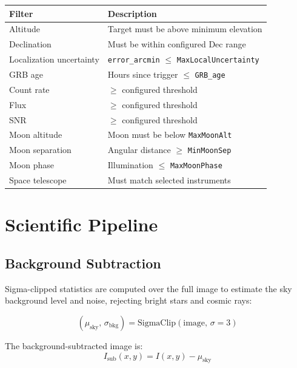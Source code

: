\documentclass[12pt,a4paper]{article}
\begin{document}
\begin{center}
\begin{tabular}{ll}
\toprule
Filter & Description \\
\midrule
Altitude & Target must be above minimum elevation \\
Declination & Must be within configured Dec range \\
Localization uncertainty & \texttt{error\_arcmin} $\leq$ \texttt{MaxLocalUncertainty} \\
GRB age & Hours since trigger $\leq$ \texttt{GRB\_age} \\
Count rate & $\geq$ configured threshold \\
Flux & $\geq$ configured threshold \\
SNR & $\geq$ configured threshold \\
Moon altitude & Moon must be below \texttt{MaxMoonAlt} \\
Moon separation & Angular distance $\geq$ \texttt{MinMoonSep} \\
Moon phase & Illumination $\leq$ \texttt{MaxMoonPhase} \\
Space telescope & Must match selected instruments \\
\bottomrule
\end{tabular}
\end{center}

\section{Scientific Pipeline}
\label{sec:science}

\subsection{Background Subtraction}

Sigma-clipped statistics are computed over the full image to estimate the
sky background level and noise, rejecting bright stars and cosmic rays:

\begin{equation}
    (\mu_\mathrm{sky},\, \sigma_\mathrm{bkg}) =
    \mathrm{SigmaClip}(\mathrm{image},\, \sigma = 3)
\end{equation}

The background-subtracted image is:
\begin{equation}
    I_\mathrm{sub}(x,y) = I(x,y) - \mu_\mathrm{sky}
\end{equation}
\end{document}
